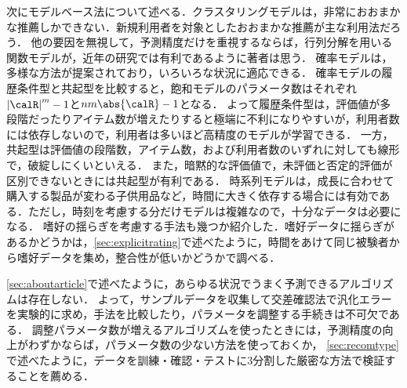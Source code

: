次にモデルベース法について述べる．クラスタリングモデルは，非常におおまかな推薦しかできない．新規利用者を対象としたおおまかな推薦が主な利用法だろう．
他の要因を無視して，予測精度だけを重視するならば，行列分解を用いる関数モデルが，近年の研究では有利であるように著者は思う．
確率モデルは，多様な方法が提案されており，いろいろな状況に適応できる．
確率モデルの履歴条件型と共起型を比較すると，飽和モデルのパラメータ数はそれぞれ${|\calR|}^m-1$と$nm\abs{\calR}-1$となる．
よって履歴条件型は，評価値が多段階だったりアイテム数が増えたりすると極端に不利になりやすいが，利用者数には依存しないので，利用者は多いほど高精度のモデルが学習できる．
一方，共起型は評価値の段階数，アイテム数，および利用者数のいずれに対しても線形で，破綻しにくいといえる．
また，暗黙的な評価値で，未評価と否定的評価が区別できないときには共起型が有利である．
時系列モデルは，成長に合わせて購入する製品が変わる子供用品など，時間に大きく依存する場合には有効である．ただし，時刻を考慮する分だけモデルは複雑なので，十分なデータは必要になる．
嗜好の揺らぎを考慮する手法も幾つか紹介した．嗜好データに揺らぎがあるかどうかは，\ref{sec:explicitrating}で述べたように，時間をあけて同じ被験者から嗜好データを集め，整合性が低いかどうかで調べる．

\ref{sec:aboutarticle}で述べたように，あらゆる状況でうまく予測できるアルゴリズムは存在しない．
よって，サンプルデータを収集して交差確認法で汎化エラーを実験的に求め，手法を比較したり，パラメータを調整する手続きは不可欠である．
調整パラメータ数が増えるアルゴリズムを使ったときには，予測精度の向上がわずかならば，パラメータ数の少ない方法を使っておくか，
\ref{sec:recomtype}で述べたように，データを訓練・確認・テストに3分割した厳密な方法で検証することを薦める．
